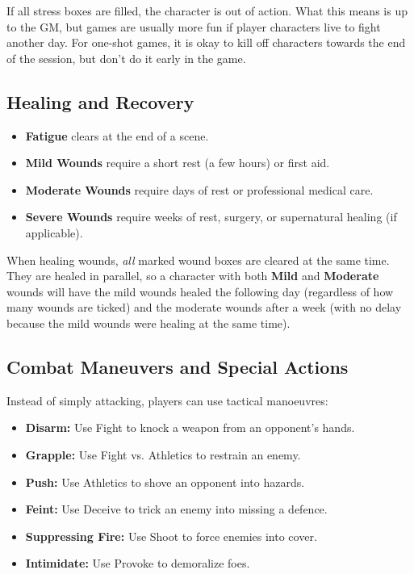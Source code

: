 If all stress boxes are filled, the character is out of action. What this means is up to the GM, but games are usually more fun if player characters live to fight another day. For one-shot games, it is okay to kill off characters towards the end of the session, but don't do it early in the game.


\subsection{Healing and Recovery}\label{core:healing}

\begin{itemize}
    \item \textbf{Fatigue} clears at the end of a scene.
    \item \textbf{Mild Wounds} require a short rest (a few hours) or first aid.
    \item \textbf{Moderate Wounds} require days of rest or professional medical care.
    \item \textbf{Severe Wounds} require weeks of rest, surgery, or supernatural healing (if applicable).
\end{itemize}

When healing wounds, \emph{all} marked wound boxes are cleared at the same time. They are healed in parallel, so a character with both \textbf{Mild} and \textbf{Moderate} wounds will have the mild wounds healed the following day (regardless of how many wounds are ticked) and the moderate wounds after a week (with no delay because the mild wounds were healing at the same time).

\subsection{Combat Maneuvers and Special Actions}
Instead of simply attacking, players can use tactical manoeuvres:

\begin{WyrdExplanation}
	\begin{itemize}
    	\item \textbf{Disarm:} Use Fight to knock a weapon from an opponent’s hands.
	    \item \textbf{Grapple:} Use Fight vs. Athletics to restrain an enemy.
    	\item \textbf{Push:} Use Athletics to shove an opponent into hazards.
	    \item \textbf{Feint:} Use Deceive to trick an enemy into missing a defence.
    	\item \textbf{Suppressing Fire:} Use Shoot to force enemies into cover.
	    \item \textbf{Intimidate:} Use Provoke to demoralize foes.
	\end{itemize}
\end{WyrdExplanation}

